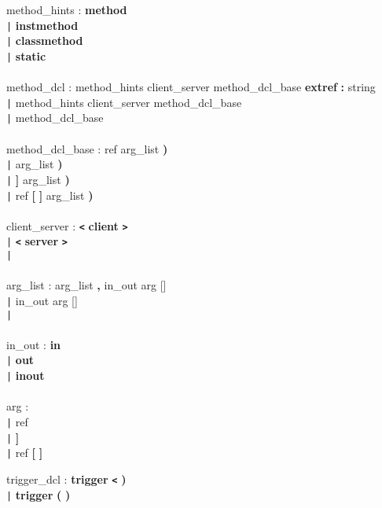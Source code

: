 \begin{tabbing}
\grindent
method\_hints \> : {\bf method}\\
\> \texttt{|} {\bf instmethod}\\
\> \texttt{|} {\bf classmethod}\\
\> \texttt{|} {\bf static}\\
\\
method\_dcl \> : method\_hints client\_server method\_dcl\_base {\bf extref} {\bf :} string\\
\> \texttt{|} method\_hints client\_server method\_dcl\_base\\
\> \texttt{|} method\_dcl\_base\\
\\
method\_dcl\_base \> : \ident ref \ident {\bf (} arg\_list {\bf )}\\
\> \texttt{|} \ident \ident {\bf (} arg\_list {\bf )}\\
\> \texttt{|} \ident {\bf [} {\bf ]} \ident {\bf (} arg\_list {\bf )}\\
\> \texttt{|} \ident ref {\bf [} {\bf ]} \ident {\bf (} arg\_list {\bf )}\\
\\
client\_server \> : {\bf \texttt{<}} {\bf client} {\bf \texttt{>}}\\
\> \texttt{|} {\bf \texttt{<}} {\bf server} {\bf \texttt{>}}\\
\> \texttt{|}\\
\\
arg\_list \> : arg\_list {\bf ,} in\_out arg [\ident]\\
\> \texttt{|} in\_out arg [\ident]\\
\> \texttt{|}\\
\\
in\_out \> : {\bf in}\\
\> \texttt{|} {\bf out}\\
\> \texttt{|} {\bf inout}\\
\\
arg \> : \ident\\
\> \texttt{|} \ident ref\\
\> \texttt{|} \ident {\bf [} {\bf ]}\\
\> \texttt{|} \ident ref {\bf [} {\bf ]}
\end{tabbing}

\begin{tabbing}
\grindent
trigger\_dcl \> : {\bf trigger} {\bf \texttt{<}} \ident {\bf \texttt{>}} \ident {\bf (} {\bf )}\\
\> \texttt{|} {\bf trigger} \ident {\bf \texttt{<}} \ident {\bf \texttt{>}} {\bf (} {\bf )}
\end{tabbing}

